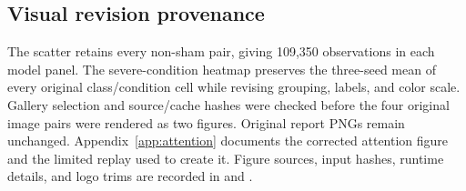 \subsection{Visual revision provenance}
The scatter retains every non-sham pair, giving 109,350 observations in each model panel. The severe-condition heatmap preserves the three-seed mean of every original class/condition cell while revising grouping, labels, and color scale. Gallery selection and source/cache hashes were checked before the four original image pairs were rendered as two figures. Original report PNGs remain unchanged. Appendix~\ref{app:attention} documents the corrected attention figure and the limited replay used to create it. Figure sources, input hashes, runtime details, and logo trims are recorded in  and .
